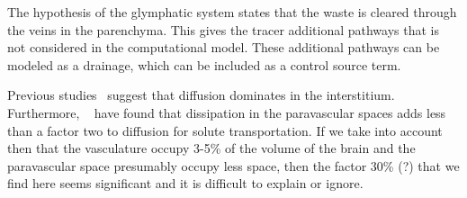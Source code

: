 \documentclass[11pt,a4paper]{article}
\begin{document}
The hypothesis of the glymphatic system \cite{iliff2012paravascular} states that the waste is cleared through the veins in the parenchyma. This gives the tracer additional pathways that is not considered in the computational model. These additional pathways can be modeled as a drainage, which can be included as a control source term. 

Previous studies~\cite{holter2017interstitial, smith2017glymphatic} suggest that diffusion dominates in the interstitium. Furthermore, 
~\cite{asgari2016glymphatic, brynjfm, diem?} have found that dissipation in the paravascular spaces adds less than a factor two
to diffusion for solute transportation. If we take into account then that the vasculature occupy 3-5\% of the volume
of the brain and the paravascular space presumably occupy less space, then the factor 30\% (?) that we find here 
seems significant and it is difficult to explain or ignore.      



 



%
%
% 
% 
% 
%
% 
\end{document}
